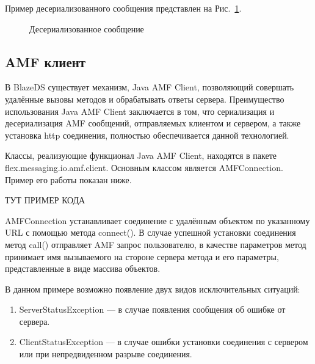 Пример десериализованного сообщения представлен на Рис.~\ref{ris:deserialisedMessage.png}.

\begin{figure}[ht]
\caption{Десериализованное сообщение}
\label{ris:deserialisedMessage.png}
\end{figure} 

\subsection{AMF клиент}

В BlazeDS существует механизм, Java AMF Client, позволяющий совершать удалённые вызовы методов и обрабатывать ответы
сервера. Преимущество использования Java AMF Client заключается в том, что сериализация и десериализация AMF сообщений,
отправляемых клиентом и сервером, а также установка http соединения, полностью обеспечивается данной технологией.

Классы, реализующие функционал Java AMF Client, находятся в пакете flex.messaging.io.amf.client. Основным классом
является AMFConnection. Пример его работы показан ниже.

 ТУТ ПРИМЕР КОДА

AMFConnection устанавливает соединение с удалённым объектом по указанному URL с помощью метода connect().
В случае успешной установки соединения метод call() отправляет AMF запрос пользователю, в качестве параметров метод
принимает имя вызываемого на стороне сервера метода и его параметры, представленные в виде массива объектов.

В данном примере возможно появление двух видов исключительных ситуаций:

\begin{enumerate}
\item ServerStatusException --- в случае появления сообщения об ошибке от сервера.
\item ClientStatusException --- в случае ошибки установки соединения с сервером или при непредвиденном разрыве
соединения.
\end{enumerate}

